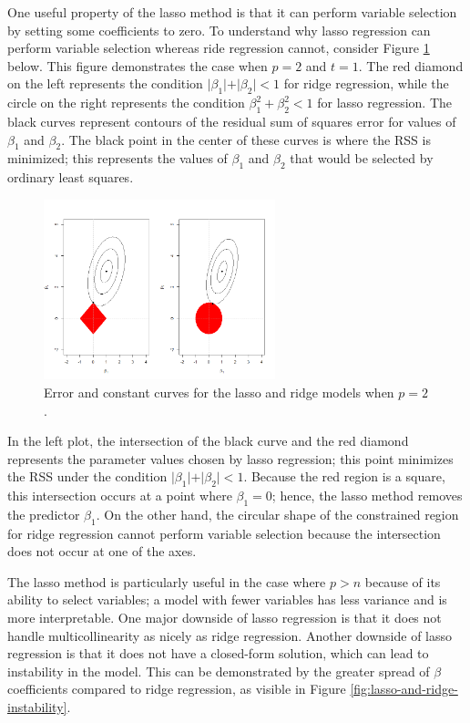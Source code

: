 \documentclass{article}
\begin{document}
One useful property of the lasso method is that it can perform variable selection by setting some coefficients to zero. To understand why lasso regression can perform variable selection whereas ride regression cannot, consider Figure \ref{fig:ridge-lasso} below. This figure demonstrates the case when $p=2$ and $t = 1$. The red diamond on the left represents the condition $\vert \beta_1 \vert + \vert \beta_2 \vert < 1$ for ridge regression, while the circle on the right represents the condition $\beta_1^2 + \beta_2^2 < 1$ for lasso regression. The black curves represent contours of the residual sum of squares error for values of $\beta_1$ and $\beta_2$. The black point in the center of these curves is where the RSS is minimized; this represents the values of $\beta_1$ and $\beta_2$ that would be selected by ordinary least squares.

\begin{figure}[!h]
	\centering
	\caption{Error and constant curves for the lasso and ridge models when $p=2$.}
	\label{fig:ridge-lasso}
	\includegraphics[width = 0.6\textwidth]{images/ridge-lasso.png}
\end{figure}

In the left plot, the intersection of the black curve and the red diamond represents the parameter values chosen by lasso regression; this point minimizes the RSS under the condition $\vert \beta_1 \vert + \vert \beta_2 \vert < 1$. Because the red region is a square, this intersection occurs at a point where $\beta_1 = 0$; hence, the lasso method removes the predictor $\beta_1$. On the other hand, the circular shape of the constrained region for ridge regression cannot perform variable selection because the intersection does not occur at one of the axes.

The lasso method is particularly useful in the case where $p>n$ because of its ability to select variables; a model with fewer variables has less variance and is more interpretable. One major downside of lasso regression is that it does not handle multicollinearity as nicely as ridge regression. Another downside of lasso regression is that it does not have a closed-form solution, which can lead to instability in the model. This can be demonstrated by the greater spread of $\beta$ coefficients compared to ridge regression, as visible in Figure \ref{fig:lasso-and-ridge-instability}.
\end{document}
